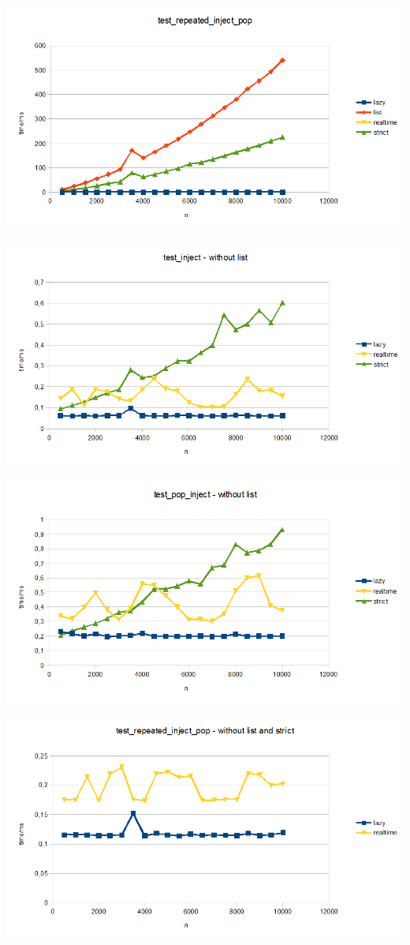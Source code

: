\includegraphics[scale=0.7]{Graphs/test_repeated_inject_pop.png}


\includegraphics[scale=0.7]{Graphs/test_inject_without_list.png}


\includegraphics[scale=0.7]{Graphs/test_pop_inject_without_list.png}


\includegraphics[scale=0.7]{Graphs/test_repeated_inject_pop_without_list.png}


